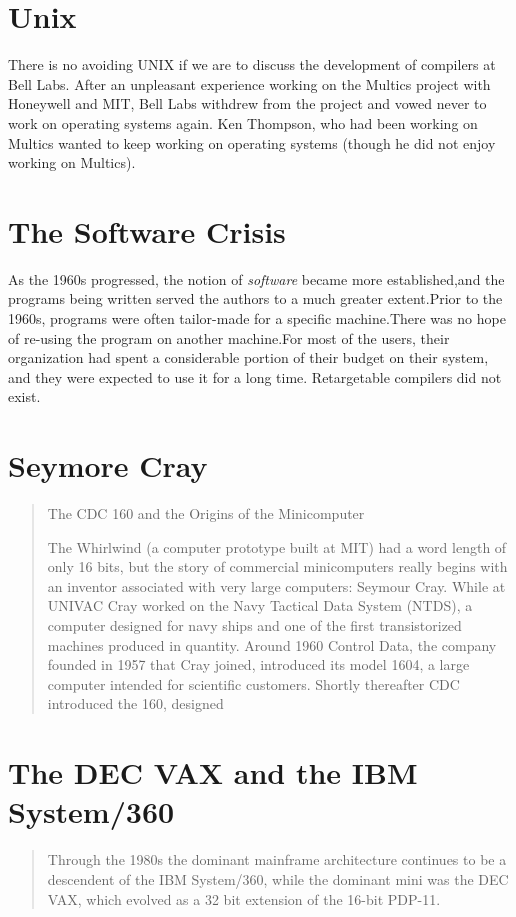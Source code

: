 \section{Unix}

There is no avoiding UNIX if we are to discuss the development of compilers at Bell Labs.
After an unpleasant experience working on the Multics project with Honeywell and MIT,
Bell Labs withdrew from the project and vowed never to work on operating systems again.
Ken Thompson, who had been working on Multics wanted to keep working on operating systems
(though he did not enjoy working on Multics).

\section{The Software Crisis}
As the 1960s progressed, 
the notion of 
\textit{software} became more established,and the programs being written served the authors to a 
much greater extent.Prior to the 1960s, programs were often tailor-made for a specific 
machine.There was no hope of re-using the program on another machine.For most of the users, their 
organization had spent a considerable portion of their budget on their system, and they were 
expected to use it for a long time. Retargetable compilers did not exist.

\section{Seymore Cray}
\begin{quotation}
    The CDC 160 and the Origins of the Minicomputer
    
    The Whirlwind (a computer prototype built at 
MIT) had a word length of only 16 bits, but the story of commercial minicomputers really begins with 
an inventor associated with very large computers: Seymour Cray. While at UNIVAC Cray worked on the 
Navy Tactical Data System (NTDS), a computer designed for navy ships and one of the first 
transistorized machines produced in quantity. Around 1960 Control Data, the company founded in 1957 
that Cray joined, introduced its model 1604, a large computer intended for scientific customers. 
Shortly thereafter CDC introduced the 160, designed
\cite{nothing_new_since_von_neumann_2000}
\end{quotation}
\section{The DEC VAX and the IBM System/360}
\begin{quotation}
    Through the 1980s the dominant mainframe architecture continues to be a descendent of the IBM 
System/360, while the dominant mini was the DEC VAX, which evolved as a 32 bit extension of the 
16-bit PDP-11.
\cite{nothing_new_since_von_neumann_2000}
\end{quotation}

